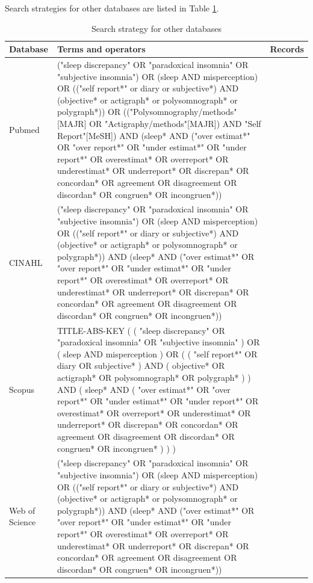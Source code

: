 \documentclass[
]{article}
\begin{document}
\newpage

Search strategies for other databases are listed in Table \ref{tab:databases}.

\begin{table}[!h]
\centering
\caption{\label{tab:databases}Search strategy for other databases}
\centering
\fontsize{8}{10}\selectfont
\begin{tabular}[t]{>{\raggedright\arraybackslash}p{7em}>{\raggedright\arraybackslash}p{40em}>{\raggedleft\arraybackslash}p{4em}}
\toprule
Database & Terms and operators & Records\\
\midrule
Pubmed & ("sleep discrepancy" OR "paradoxical insomnia" OR "subjective insomnia") OR (sleep AND misperception) OR
(("self report*" or diary or subjective*) AND (objective* or actigraph* or polysomnograph* or polygraph*)) OR (("Polysomnography/methods"[MAJR] OR "Actigraphy/methods"[MAJR]) AND "Self Report"[MeSH])
AND (sleep* AND ("over estimat*" OR "over report*" OR "under estimat*" OR "under report*" OR overestimat* OR overreport* OR underestimat* OR underreport* OR discrepan* OR concordan* OR agreement OR disagreement OR discordan* OR congruen* OR incongruen*)) & 761\\
CINAHL & ("sleep discrepancy" OR "paradoxical insomnia" OR "subjective insomnia") OR (sleep AND misperception) OR
(("self report*" or diary or subjective*) AND (objective* or actigraph* or polysomnograph* or polygraph*))
AND (sleep* AND ("over estimat*" OR "over report*" OR "under estimat*" OR "under report*" OR overestimat* OR overreport* OR underestimat* OR underreport* OR discrepan* OR concordan* OR agreement OR disagreement OR discordan* OR congruen* OR incongruen*)) & 310\\
Scopus & TITLE-ABS-KEY ( ( "sleep discrepancy"  OR  "paradoxical insomnia"  OR  "subjective insomnia" )  OR  ( sleep  AND  misperception )  OR  ( ( "self report*"  OR  diary  OR  subjective* )  AND  ( objective*  OR  actigraph*  OR  polysomnograph*  OR  polygraph* ) )  AND  ( sleep*  AND  ( "over estimat*"  OR  "over report*"  OR  "under estimat*"  OR  "under report*"  OR  overestimat*  OR  overreport*  OR  underestimat*  OR  underreport*  OR  discrepan*  OR  concordan*  OR  agreement  OR  disagreement  OR  discordan*  OR  congruen*  OR  incongruen* ) ) ) & 826\\
Web of Science & ("sleep discrepancy" OR "paradoxical insomnia" OR "subjective insomnia") OR (sleep AND misperception) OR
(("self report*" or diary or subjective*) AND (objective* or actigraph* or polysomnograph* or polygraph*))
AND (sleep* AND ("over estimat*" OR "over report*" OR "under estimat*" OR "under report*" OR overestimat* OR overreport* OR underestimat* OR underreport* OR discrepan* OR concordan* OR agreement OR disagreement OR discordan* OR congruen* OR incongruen*)) & 1288\\

\end{tabular}
\end{table}
\end{document}
